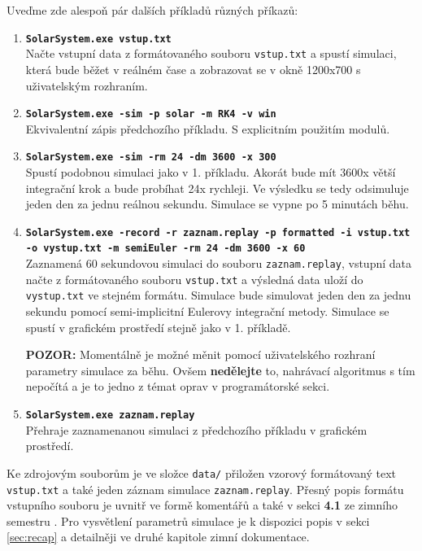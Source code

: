 Uveďme zde alespoň pár dalších příkladů různých příkazů:
\begin{enumerate}
	\item \texttt{\textbf{SolarSystem.exe vstup.txt}} \\
	Načte vstupní data z formátovaného souboru \texttt{vstup.txt} a spustí simulaci, která bude běžet v reálném čase a zobrazovat se v okně 1200x700 s uživatelským rozhraním.
	\item \texttt{\textbf{SolarSystem.exe -sim -p solar -m RK4 -v win}} \\
	 Ekvivalentní zápis předchozího příkladu. S explicitním použitím modulů.
	\item \texttt{\textbf{SolarSystem.exe -sim -rm 24 -dm 3600 -x 300}} \\
	Spustí podobnou simulaci jako v 1. příkladu. Akorát bude mít 3600x větší integrační krok a bude probíhat 24x rychleji. Ve výsledku se tedy odsimuluje jeden den za jednu reálnou sekundu. Simulace se vypne po 5 minutách běhu.
	\item \texttt{\textbf{SolarSystem.exe -record -r zaznam.replay -p formatted -i vstup.txt -o vystup.txt -m semiEuler -rm 24 -dm 3600 -x 60}}\\
	Zaznamená 60 sekundovou simulaci do souboru \texttt{zaznam.replay}, vstupní data načte z formátovaného souboru \texttt{vstup.txt} a výsledná data uloží do \texttt{vystup.txt} ve stejném formátu. Simulace bude simulovat jeden den za jednu sekundu pomocí semi-implicitní Eulerovy integrační metody. Simulace se spustí v grafickém prostředí stejně jako v 1. příkladě.
	
	\textbf{POZOR:} Momentálně je možné měnit pomocí uživatelského rozhraní parametry simulace za běhu. Ovšem \textbf{nedělejte} to, nahrávací algoritmus s tím nepočítá a je to jedno z témat oprav v programátorské sekci.
	\item  \texttt{\textbf{SolarSystem.exe zaznam.replay}}\\
	Přehraje zaznamenanou simulaci z předchozího příkladu v grafickém prostředí.
\end{enumerate}
Ke zdrojovým souborům je ve složce \texttt{data/} přiložen vzorový formátovaný text \texttt{vstup.txt} a také jeden záznam simulace \texttt{zaznam.replay}.
Přesný popis formátu vstupního souboru je uvnitř ve formě komentářů a také v sekci \textbf{4.1} ze zimního semestru . Pro vysvětlení parametrů simulace je k dispozici popis v sekci \ref{sec:recap} a detailněji ve druhé kapitole zimní dokumentace.


\FloatBarrier
